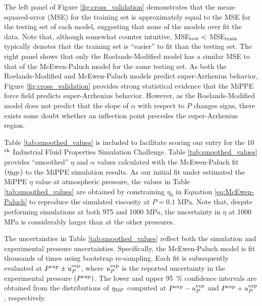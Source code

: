 \documentclass[preprint,review,12pt]{elsarticle}
\begin{document}
	The left panel of Figure \ref{fig:cross_validation} demonstrates that the mean-squared-error (MSE) for the training set is approximately equal to the MSE for the testing set of each model, suggesting that none of the models over fit the data. Note that, although somewhat counter intuitive, MSE$_{\rm test} < $ MSE$_{\rm train}$ typically denotes that the training set is ``easier'' to fit than the testing set. The right panel shows that only the Roelands-Modified model has a similar MSE to that of the McEwen-Paluch model for the same testing set. As both the Roelands-Modified and McEwen-Paluch models predict super-Arrhenius behavior, Figure \ref{fig:cross_validation} provides strong statistical evidence that the MiPPE force field predicts super-Arrhenius behavior. However, as the Roelands-Modified model does not predict that the slope of $\alpha$ with respect to $P$ changes signs, there exists some doubt whether an inflection point precedes the super-Arrhenius region.
	
	
	
	Table \ref{tab:smoothed_values} is included to facilitate scoring our entry for the 10$^{\rm th}$ Industrial Fluid Properties Simulation Challenge. Table \ref{tab:smoothed_values} provides ``smoothed'' $\eta$ and $\alpha$ values calculated with the McEwen-Paluch fit $(\eta_{\rm MP})$ to the MiPPE simulation results. As our initial fit under estimated the MiPPE $\eta$ value at atmospheric pressure, the values in Table \ref{tab:smoothed_values} are obtained by constraining $\eta_0$ in Equation \ref{eq:McEwen-Paluch} to reproduce the simulated viscosity at $P = 0.1$ MPa. Note that, despite performing simulations at both 975 and 1000 MPa, the uncertainty in $\eta$ at 1000 MPa is considerably larger than at the other pressures. 
	
	
	The uncertainties in Table \ref{tab:smoothed_values} reflect both the simulation and experimental pressure uncertainties. Specifically, the McEwen-Paluch model is fit thousands of times using bootstrap re-sampling. Each fit is subsequently evaluated at $P^{\rm exp} \pm u_P^{\rm exp}$, where $u_P^{\rm exp}$ is the reported uncertainty in the experimental pressure $(P^{\rm exp})$. The lower and upper 95~\% confidence intervals are obtained from the distributions of $\eta_{\rm MP}$ computed at $P^{\rm exp} - u_P^{\rm exp}$ and $P^{\rm exp} + u_P^{\rm exp}$, respectively.
	
\end{document}
